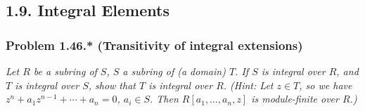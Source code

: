 \documentclass{article}
\begin{document}



\subsection*{1.9. Integral Elements \\}



\subsubsection*{Problem 1.46.* (Transitivity of integral extensions)}
\emph{Let $R$ be a subring of $S$, $S$ a subring of (a domain) $T$.
If $S$ is integral over $R$, and $T$ is integral over $S$,
show that $T$ is integral over $R$.
(Hint: Let $z \in T$, so we have
$z^n + a_1 z^{n-1} + \cdots + a_n = 0$, $a_i \in S$.
Then $R[a_1, \ldots, a_n, z]$ is module-finite over $R$.)} \\
\end{document}
